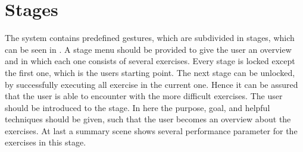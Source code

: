 \section{Stages}\label{4_3_stages}
The system contains predefined gestures, which are subdivided in stages, which can be seen in \textbf{}. A stage menu should be provided to give the user an overview and in which each one consists of several exercises. Every stage is locked except the first one, which is the users starting point. The next stage can be unlocked, by successfully executing all exercise in the current one. Hence it can be assured that the user is able to encounter with the more difficult exercises. The user should be introduced to the stage. In here the purpose, goal, and helpful techniques should be given, such that the user becomes an overview about the exercises. At last a summary scene shows several performance parameter for the exercises in this stage.
\begin{comment}
\\- system should provide predefined exercises that can be tracked per user
\\- A stage menu should be provided to the user, which shows her the amount of stages to complete
\\- It consists of 4 stages each with specific exercises (Preliminary, First contact with slacklining,  Static exercises, Dynamic exercises) like explained in chapter 3
\\- A stage consists of several exercises like explained in prev. chapter
\\- locked stages (initial first stage interactable)
\\- unlock stages (by successfully accomplishing all exercises from current stage)
\\- Stage introduction gives general information, describes the goal and tips for the current stage
-- a stage information scene provides her with the general introduction of this stage --> unlocks first exercise
\\- Stage summary contains average data about each exercise
\end{comment}
